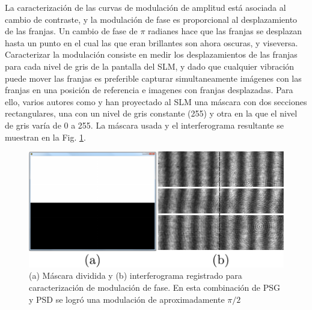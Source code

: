 La caracterización de las curvas de modulación de amplitud está
asociada al cambio de contraste, y la modulación de fase es
proporcional al desplazamiento de las franjas. Un cambio de fase de
$\pi$ radianes hace que las franjas se desplazan hasta un punto en el
cual las que eran brillantes son ahora oscuras, y
viseversa. Caracterizar la modulación consiste en medir los 
desplazamientos de las franjas para cada nivel de gris de la pantalla
del SLM, y dado que cualquier vibración puede mover las franjas es
preferible capturar simultaneamente imágenes con las franjas en una
posición de referencia e imagenes con franjas 
desplazadas. Para ello, varios autores como  y
 han proyectado al SLM una máscara con dos
secciones rectangulares, una con un nivel de gris constante (255) y
otra en la que el nivel de gris varía de 0 a 255. La máscara usada y
el interferograma resultante se muestran en la Fig. \ref{fig:split}.  
\begin{figure}[h!]
\centering
\includegraphics[scale=1]{split.pdf}
\caption[Máscara dividida e interferograma obtenido para
caracterización de modulación de fase]{(a) Máscara dividida y (b)
  interferograma registrado para
caracterización de modulación de fase. En esta combinación de PSG y
PSD se logró una modulación de aproximadamente $\pi/2$}
\label{fig:split}
\end{figure}

